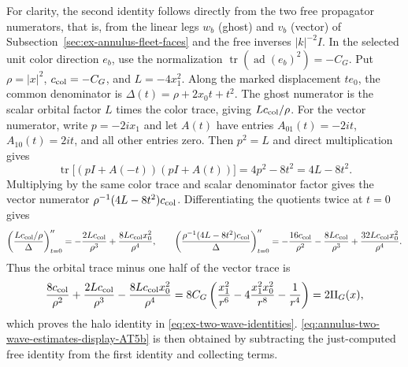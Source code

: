 For clarity, the second identity follows directly from the two free
propagator numerators, that is, from the linear legs $w_b$ (ghost) and
$v_b$ (vector) of Subsection~\ref{sec:ex-annulus-fleet-faces} and the free
inverses $|k|^{-2}I$. In the selected unit color direction $e_b$, use the
normalization $\operatorname{tr}(\operatorname{ad}(e_b)^2)=-C_G$. Put
$\rho=|x|^2$, $c_{\rm col}=-C_G$, and $L=-4x_1^2$. Along the marked
displacement $t e_0$, the common denominator is
$\Delta(t)=\rho+2x_0t+t^2$. The ghost numerator is the scalar orbital
factor $L$ times the color trace, giving $Lc_{\rm col}/\rho$. For the
vector numerator, write $p=-2i x_1$ and let $A(t)$ have entries
$A_{01}(t)=-2it$, $A_{10}(t)=2it$, and all other entries zero. Then
$p^2=L$ and direct multiplication gives
\[
 \operatorname{tr}\bigl[(pI+A(-t))(pI+A(t))\bigr]
       =4p^2-8t^2=4L-8t^2.
\]
Multiplying by the same color trace and scalar denominator factor gives
the vector numerator $\rho^{-1}(4L-8t^2)c_{\rm col}$. Differentiating
the quotients twice at $t=0$ gives
\[
 \left(\frac{Lc_{\rm col}/\rho}{\Delta}\right)''_{t=0}
       =-\frac{2Lc_{\rm col}}{\rho^3}
           +\frac{8Lc_{\rm col}x_0^2}{\rho^4},\qquad
 \left(\frac{\rho^{-1}(4L-8t^2)c_{\rm col}}{\Delta}\right)''_{t=0}
       =-\frac{16c_{\rm col}}{\rho^2}
         -\frac{8Lc_{\rm col}}{\rho^3}
         +\frac{32Lc_{\rm col}x_0^2}{\rho^4}.
\]
Thus the orbital trace minus one half of the vector trace is
\[
 \frac{8c_{\rm col}}{\rho^2}
       +\frac{2Lc_{\rm col}}{\rho^3}
       -\frac{8Lc_{\rm col}x_0^2}{\rho^4}
 =8C_G\left(\frac{x_1^2}{r^6}
       -4\frac{x_1^2x_0^2}{r^8}-\frac1{r^4}\right)
 =2\Pi_G(x),
\]
which proves the halo identity in \eqref{eq:ex-two-wave-identities}. \eqref{eq:annulus-two-wave-estimates-display-AT5b} is then obtained by
subtracting the just-computed free identity from the first identity and
collecting terms.

